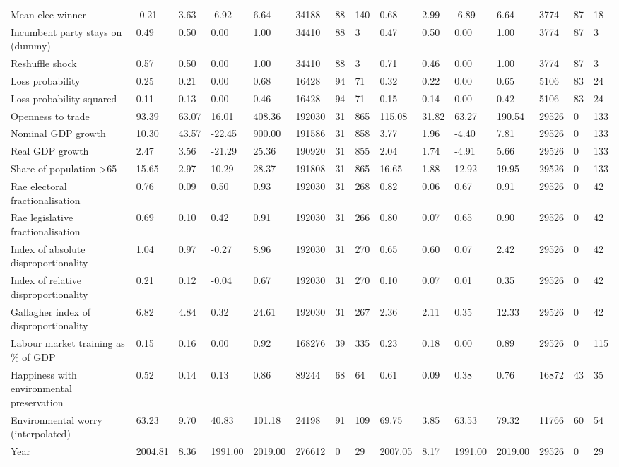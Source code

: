 \begin{longtable}{lllllllllllllll}
Mean elec winner & -0.21 & 3.63 & -6.92 & 6.64 & 34188 & 88 & 140 & 0.68 & 2.99 & -6.89 & 6.64 & 3774 & 87 & 18\\
Incumbent party stays on (dummy) & 0.49 & 0.50 & 0.00 & 1.00 & 34410 & 88 & 3 & 0.47 & 0.50 & 0.00 & 1.00 & 3774 & 87 & 3\\
Reshuffle shock & 0.57 & 0.50 & 0.00 & 1.00 & 34410 & 88 & 3 & 0.71 & 0.46 & 0.00 & 1.00 & 3774 & 87 & 3\\
Loss probability & 0.25 & 0.21 & 0.00 & 0.68 & 16428 & 94 & 71 & 0.32 & 0.22 & 0.00 & 0.65 & 5106 & 83 & 24\\
\addlinespace
Loss probability squared & 0.11 & 0.13 & 0.00 & 0.46 & 16428 & 94 & 71 & 0.15 & 0.14 & 0.00 & 0.42 & 5106 & 83 & 24\\
Openness to trade & 93.39 & 63.07 & 16.01 & 408.36 & 192030 & 31 & 865 & 115.08 & 31.82 & 63.27 & 190.54 & 29526 & 0 & 133\\
Nominal GDP growth & 10.30 & 43.57 & -22.45 & 900.00 & 191586 & 31 & 858 & 3.77 & 1.96 & -4.40 & 7.81 & 29526 & 0 & 133\\
Real GDP growth & 2.47 & 3.56 & -21.29 & 25.36 & 190920 & 31 & 855 & 2.04 & 1.74 & -4.91 & 5.66 & 29526 & 0 & 133\\
Share of population >65 & 15.65 & 2.97 & 10.29 & 28.37 & 191808 & 31 & 865 & 16.65 & 1.88 & 12.92 & 19.95 & 29526 & 0 & 133\\
\addlinespace
Rae electoral fractionalisation & 0.76 & 0.09 & 0.50 & 0.93 & 192030 & 31 & 268 & 0.82 & 0.06 & 0.67 & 0.91 & 29526 & 0 & 42\\
Rae legislative fractionalisation & 0.69 & 0.10 & 0.42 & 0.91 & 192030 & 31 & 266 & 0.80 & 0.07 & 0.65 & 0.90 & 29526 & 0 & 42\\
Index of absolute disproportionality & 1.04 & 0.97 & -0.27 & 8.96 & 192030 & 31 & 270 & 0.65 & 0.60 & 0.07 & 2.42 & 29526 & 0 & 42\\
Index of relative disproportionality & 0.21 & 0.12 & -0.04 & 0.67 & 192030 & 31 & 270 & 0.10 & 0.07 & 0.01 & 0.35 & 29526 & 0 & 42\\
Gallagher index of disproportionality & 6.82 & 4.84 & 0.32 & 24.61 & 192030 & 31 & 267 & 2.36 & 2.11 & 0.35 & 12.33 & 29526 & 0 & 42\\
\addlinespace
Labour market training as \% of GDP & 0.15 & 0.16 & 0.00 & 0.92 & 168276 & 39 & 335 & 0.23 & 0.18 & 0.00 & 0.89 & 29526 & 0 & 115\\
Happiness with environmental preservation & 0.52 & 0.14 & 0.13 & 0.86 & 89244 & 68 & 64 & 0.61 & 0.09 & 0.38 & 0.76 & 16872 & 43 & 35\\
Environmental worry (interpolated) & 63.23 & 9.70 & 40.83 & 101.18 & 24198 & 91 & 109 & 69.75 & 3.85 & 63.53 & 79.32 & 11766 & 60 & 54\\
Year & 2004.81 & 8.36 & 1991.00 & 2019.00 & 276612 & 0 & 29 & 2007.05 & 8.17 & 1991.00 & 2019.00 & 29526 & 0 & 29\\
\bottomrule
\end{longtable}
